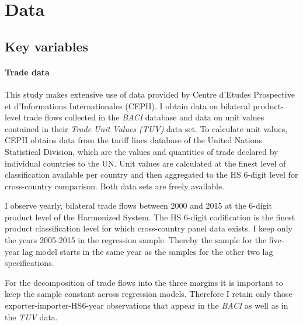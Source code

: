 \documentclass[12pt,a4paper,oneside,times]{article}   	%
\begin{document}




\section{Data}
\subsection{Key variables}
\paragraph{Trade data}
This study makes extensive use of data provided by Centre d'Etudes Prospective et d'Informations Internationales (CEPII). I obtain data on bilateral product-level trade flows collected in the \emph{BACI} database and data on unit values contained in their \emph{Trade Unit Values (TUV)} data set. To calculate unit values, CEPII obtains data from the tariff lines database of the United Nations Statistical Division, which are the values and quantities of trade declared by individual countries to the UN. Unit values are calculated at the finest level of classification available per country and then aggregated to the HS 6-digit level for cross-country comparison. Both data sets are freely available. 

I observe yearly, bilateral trade flows between 2000 and 2015 at the 6-digit product level of the Harmonized System. The HS 6-digit codification is the finest product classification level for which cross-country panel data exists. I keep only the years 2005-2015 in the regression sample. Thereby the sample for the five-year lag model starts in the same year as the samples for the other two lag specifications. 

For the decomposition of trade flows into the three margins it is important to keep the sample constant across regression models. Therefore I retain only those exporter-importer-HS6-year observations that appear in the \emph{BACI} as well as in the \emph{TUV} data. 
\end{document}
